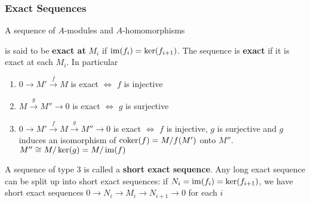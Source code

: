 \documentclass[11pt]{article}
\begin{document}
\subsubsection*{Exact Sequences}
\label{sec:org70d00e4}
A sequence of \(A\)-modules and \(A\)-homomorphisms
\begin{center}\end{center}
is said to be \textbf{exact at} \(M_i\) if \(\operatorname{im}(f_i)=\ker(f_{i+1})\). The sequence is \textbf{exact} if it is exact
at each \(M_i\). In particular
\begin{enumerate}
\item \(0\to M'\xrightarrow{f}M\) is exact \(\Leftrightarrow\) \(f\) is injective
\item \(M\xrightarrow{g}M''\to 0\) is exact \(\Leftrightarrow\) \(g\) is surjective
\item \(0\to M'\xrightarrow{f}M\xrightarrow{g}M''\to 0\) is exact \(\Leftrightarrow\) \(f\) is injective, \(g\) is surjective and \(g\)
induces an isomorphism of \(\operatorname{coker}(f)=M/f(M')\) onto \(M''\).
\(M''\cong M/\ker(g)=M/\operatorname{im}(f)\)
\end{enumerate}


A sequence of type 3 is called a \textbf{short exact sequence}. Any long exact sequence can be split up
into short exact sequences: if \(N_i=\operatorname{im}(f_i)=\ker(f_{i+1})\), we have short exact
sequences \(0\to N_i\to M_i\to N_{i+1}\to 0\) for each \(i\)
\end{document}
